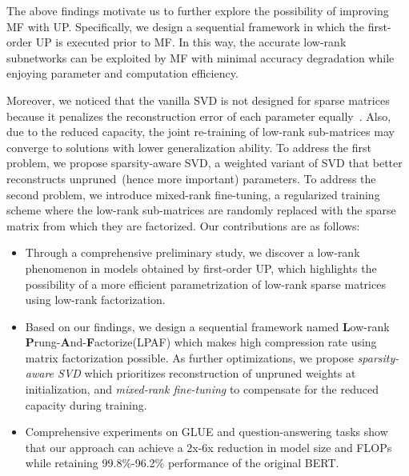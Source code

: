 The above  findings motivate us to further explore the possibility of improving MF with UP.  Specifically, we design a sequential framework in which the first-order UP is executed prior to MF. In this way, the accurate low-rank 
subnetworks can be exploited by MF with minimal accuracy degradation while 
enjoying parameter and computation efficiency.

Moreover, we noticed that the vanilla SVD is not designed for 
sparse matrices because it penalizes the reconstruction error of 
each parameter equally~\cite{group}. Also, due to the reduced capacity, 
the joint re-training of low-rank sub-matrices may converge to 
solutions with lower generalization ability. To address the first problem, 
we propose sparsity-aware SVD, a weighted variant of SVD that 
better reconstructs unpruned~(hence more important) parameters. 
To address the second problem, we introduce mixed-rank fine-tuning, 
a regularized training scheme where the low-rank sub-matrices 
are randomly replaced with the sparse matrix from which they are factorized. Our contributions are  as follows:
\begin{itemize}
	\item Through a comprehensive preliminary study, 
	we discover a low-rank phenomenon in models obtained by first-order UP, 
	which highlights the possibility of a more efficient parametrization 
	of low-rank sparse matrices using low-rank factorization.
	\item Based on our findings, we design a sequential framework named  \textbf{L}ow-rank \textbf{P}rung-\textbf{A}nd-\textbf{F}actorize(LPAF) which makes high compression rate using matrix factorization possible.
	As further optimizations, we propose \textit{sparsity-aware SVD} which 
	prioritizes reconstruction of unpruned weights at initialization, 
	and \textit{mixed-rank fine-tuning} to compensate for the reduced capacity 
	during training.
	\item Comprehensive experiments on GLUE and 
	question-answering tasks show that our approach can achieve 
	a 2x-6x reduction in model size and FLOPs while retaining 99.8\%-96.2\% performance of the original BERT.
\end{itemize}
